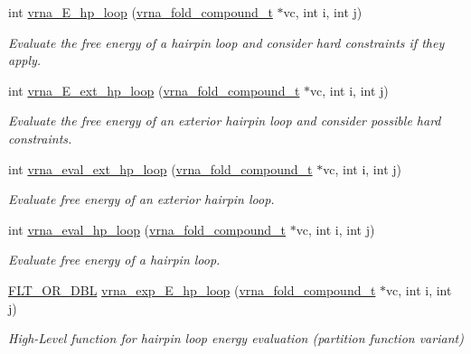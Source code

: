 \begin{DoxyCompactItemize}
int \hyperlink{group__loops_ga999ba163a8148d72fd5f22819a681df7}{vrna\+\_\+\+E\+\_\+hp\+\_\+loop} (\hyperlink{group__fold__compound_ga1b0cef17fd40466cef5968eaeeff6166}{vrna\+\_\+fold\+\_\+compound\+\_\+t} $\ast$vc, int i, int j)
\begin{DoxyCompactList}\small\item\em Evaluate the free energy of a hairpin loop and consider hard constraints if they apply. \end{DoxyCompactList}\item 
int \hyperlink{group__loops_gac3393ee309372eccae944e3a07f455f9}{vrna\+\_\+\+E\+\_\+ext\+\_\+hp\+\_\+loop} (\hyperlink{group__fold__compound_ga1b0cef17fd40466cef5968eaeeff6166}{vrna\+\_\+fold\+\_\+compound\+\_\+t} $\ast$vc, int i, int j)
\begin{DoxyCompactList}\small\item\em Evaluate the free energy of an exterior hairpin loop and consider possible hard constraints. \end{DoxyCompactList}\item 
\mbox{\label{group__loops_gad3b92453a6b501856eec8fae39f3235d}} 
int \hyperlink{group__loops_gad3b92453a6b501856eec8fae39f3235d}{vrna\+\_\+eval\+\_\+ext\+\_\+hp\+\_\+loop} (\hyperlink{group__fold__compound_ga1b0cef17fd40466cef5968eaeeff6166}{vrna\+\_\+fold\+\_\+compound\+\_\+t} $\ast$vc, int i, int j)
\begin{DoxyCompactList}\small\item\em Evaluate free energy of an exterior hairpin loop. \end{DoxyCompactList}\item 
int \hyperlink{group__loops_gab3eb4651dc26dc2b653a57dd340d7e68}{vrna\+\_\+eval\+\_\+hp\+\_\+loop} (\hyperlink{group__fold__compound_ga1b0cef17fd40466cef5968eaeeff6166}{vrna\+\_\+fold\+\_\+compound\+\_\+t} $\ast$vc, int i, int j)
\begin{DoxyCompactList}\small\item\em Evaluate free energy of a hairpin loop. \end{DoxyCompactList}\item 
\hyperlink{group__data__structures_ga31125aeace516926bf7f251f759b6126}{F\+L\+T\+\_\+\+O\+R\+\_\+\+D\+BL} \hyperlink{group__loops_gac9f49b31d3ec1d9040798b05506c71da}{vrna\+\_\+exp\+\_\+\+E\+\_\+hp\+\_\+loop} (\hyperlink{group__fold__compound_ga1b0cef17fd40466cef5968eaeeff6166}{vrna\+\_\+fold\+\_\+compound\+\_\+t} $\ast$vc, int i, int j)
\begin{DoxyCompactList}\small\item\em High-\/\+Level function for hairpin loop energy evaluation (partition function variant) \end{DoxyCompactList}\item 

\end{DoxyCompactItemize}
